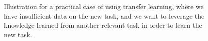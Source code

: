 \begin{figure}[!htbp]
  \centering
  \caption{Illustration for a practical case of using transfer learning, where we have insufficient data on the new task, and we want to leverage the knowledge learned from another relevant task in order to learn the new task.}
  \label{fig:illustrate_TL}
\end{figure}


